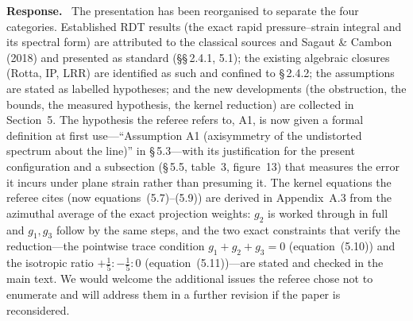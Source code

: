 \documentclass[11pt]{article}
\newcommand{\response}{\medskip\noindent\textbf{Response.}\ }
\begin{document}
\response
The presentation has been reorganised to separate the four categories.
Established RDT results (the exact rapid pressure--strain integral and its
spectral form) are attributed to the classical sources and Sagaut \& Cambon
(2018) and presented as standard (\S\S\,2.4.1, 5.1); the existing algebraic
closures (Rotta, IP, LRR) are identified as such and confined to
\S\,2.4.2; the assumptions are stated as labelled hypotheses; and the new
developments (the obstruction, the bounds, the measured hypothesis, the
kernel reduction) are collected in Section~5. The hypothesis the referee
refers to, A1, is now given a formal definition at first use---``Assumption
A1 (axisymmetry of the undistorted spectrum about the line)'' in
\S\,5.3---with its justification for the present configuration and a
subsection (\S\,5.5, table~3, figure~13) that measures the error it incurs
under plane strain rather than presuming it. The kernel equations the
referee cites (now equations~(5.7)--(5.9)) are derived in Appendix~A.3 from
the azimuthal average of the exact projection weights: $g_2$ is worked
through in full and $g_1,g_3$ follow by the same steps, and the two exact
constraints that verify the reduction---the pointwise trace condition
$g_1+g_2+g_3=0$ (equation~(5.10)) and the isotropic ratio
$+\tfrac15:-\tfrac15:0$ (equation~(5.11))---are stated and checked in the
main text. We would welcome the additional issues the referee chose not to
enumerate and will address them in a further revision if the paper is
reconsidered.
\end{document}
